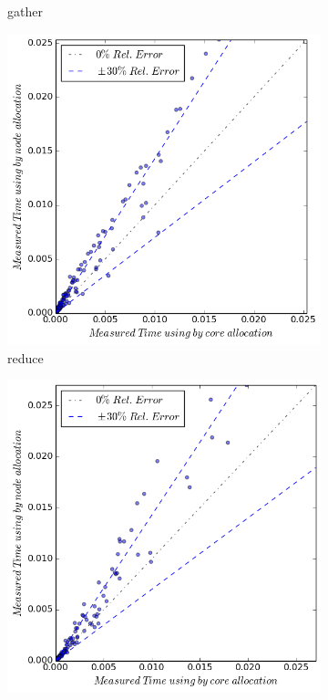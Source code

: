 \begin{figure}[ht]
\begin{subfigure}[b]{0.40\textwidth}
        \caption{gather}
    \end{subfigure}
    \quad
    \begin{subfigure}[b]{0.40\textwidth}
        \includegraphics[width=\textwidth]{./images/bycore_vs_bynode/reduce.png}
        \caption{reduce}
    \end{subfigure}
    \quad 
     \begin{subfigure}[b]{0.40\textwidth}
        \includegraphics[width=\textwidth]{./images/bycore_vs_bynode/bcast.png}

\end{subfigure}
\end{figure}
